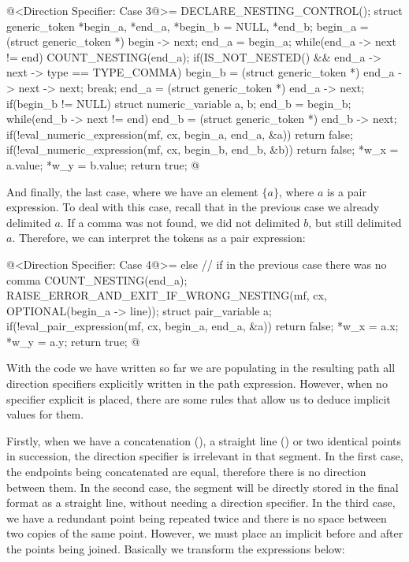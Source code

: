 {{{{{\iniciocodigo
@<Direction Specifier: Case 3@>=
DECLARE_NESTING_CONTROL();
struct generic_token *begin_a, *end_a, *begin_b = NULL, *end_b;
begin_a = (struct generic_token *) begin -> next;
end_a = begin_a;
while(end_a -> next != end){
  COUNT_NESTING(end_a);
  if(IS_NOT_NESTED() && end_a -> next -> type == TYPE_COMMA){
    begin_b = (struct generic_token *) end_a -> next -> next;
    break;
  }
  end_a = (struct generic_token *) end_a -> next;
}
if(begin_b != NULL){
  struct numeric_variable a, b;
  end_b = begin_b;
  while(end_b -> next != end)
    end_b = (struct generic_token *) end_b -> next;
  if(!eval_numeric_expression(mf, cx, begin_a, end_a, &a))
    return false;
  if(!eval_numeric_expression(mf, cx, begin_b, end_b, &b))
    return false;
  *w_x = a.value;
  *w_y = b.value;
  return true;
}
@
\fimcodigo

And finally, the last case, where we have an element $\{a\}$, where
$a$ is a pair expression. To deal with this case, recall that in the
previous case we already delimited $a$. If a comma was not found, we
did not delimited $b$, but still delimited $a$. Therefore, we can
interpret the tokens as a pair expression:

\iniciocodigo
@<Direction Specifier: Case 4@>=
else{ // if in the previous case there was no comma
  COUNT_NESTING(end_a);
  RAISE_ERROR_AND_EXIT_IF_WRONG_NESTING(mf, cx, OPTIONAL(begin_a -> line));
  struct pair_variable a;
  if(!eval_pair_expression(mf, cx, begin_a, end_a, &a))
    return false;
  *w_x = a.x;
  *w_y = a.y;
  return true;
}
@
\fimcodigo

With the code we have written so far we are populating in the
resulting path all direction specifiers explicitly written in the path
expression.  However, when no specifier explicit is placed, there are
some rules that allow us to deduce implicit values ​​for them.

Firstly, when we have a concatenation (\monoespaco{\&}), a straight
line (\monoespaco{--}) or two identical points in succession, the
direction specifier is irrelevant in that segment. In the first case,
the endpoints being concatenated are equal, therefore there is no
direction between them. In the second case, the segment will be
directly stored in the final format as a straight line, without
needing a direction specifier.  In the third case, we have a redundant
point being repeated twice and there is no space between two copies of
the same point. However, we must place an implicit 
before and after the points being joined. Basically we transform the
expressions below:

}}}}}
